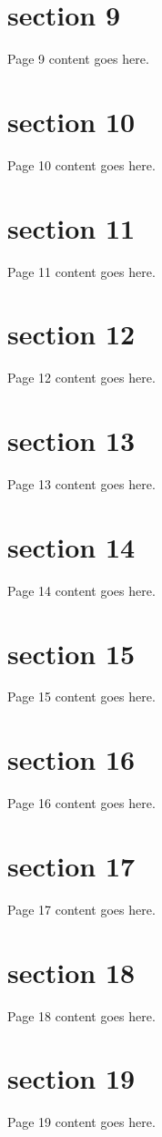 \documentclass{article}
\begin{document}
\section{section 9}
Page 9 content goes here.
\newpage

\section{section 10}
Page 10 content goes here.
\newpage

\section{section 11}
Page 11 content goes here.
\newpage

\section{section 12}
Page 12 content goes here.
\newpage

\section{section 13}
Page 13 content goes here.
\newpage

\section{section 14}
Page 14 content goes here.
\newpage

\section{section 15}
Page 15 content goes here.
\newpage

\section{section 16}
Page 16 content goes here.
\newpage

\section{section 17}
Page 17 content goes here.
\newpage

\section{section 18}
Page 18 content goes here.
\newpage

\section{section 19}
Page 19 content goes here.
\newpage
\end{document}

